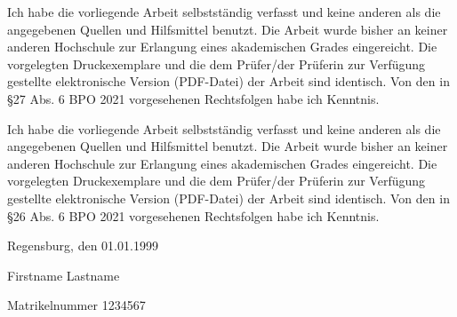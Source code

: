 \documentclass[11pt,a4paper,english,notitlepage]{report}
\newcommand{\authorname}{Firstname Lastname}
\newcommand{\studentID}{1234567}
\newcommand{\submissiondate}{01.01.1999}
\begin{document}
Ich habe die vorliegende Arbeit selbstständig verfasst und keine anderen als die angegebenen Quellen und Hilfsmittel benutzt. Die Arbeit wurde bisher an keiner anderen Hochschule zur Erlangung eines akademischen Grades eingereicht. Die vorgelegten Druckexemplare und die dem Prüfer/der Prüferin zur Verfügung gestellte elektronische Version (PDF-Datei) der Arbeit sind identisch. Von den in §27 Abs. 6 BPO 2021 vorgesehenen Rechtsfolgen habe ich Kenntnis.

\vspace*{65pt}


Ich habe die vorliegende Arbeit selbstständig verfasst und keine anderen als die angegebenen Quellen und Hilfsmittel benutzt. Die Arbeit wurde bisher an keiner anderen Hochschule zur Erlangung eines akademischen Grades eingereicht. Die vorgelegten Druckexemplare und die dem Prüfer/der Prüferin zur Verfügung gestellte elektronische Version (PDF-Datei) der Arbeit sind identisch. Von den in §26 Abs. 6 BPO 2021 vorgesehenen Rechtsfolgen habe ich Kenntnis.

\vspace*{65pt}

Regensburg, den \submissiondate

\vspace*{60pt}


\authorname

Matrikelnummer \studentID
\end{document}
